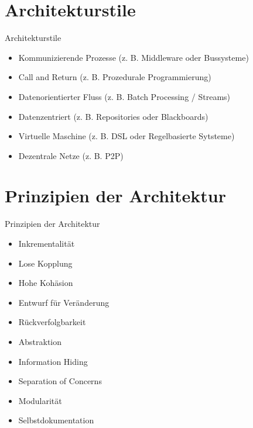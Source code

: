 \documentclass{beamer}
\begin{document}
\section{Architekturstile}

\begin{frame}{Architekturstile}
	\begin{itemize}
		\item Kommunizierende Prozesse (z. B. Middleware oder Bussysteme)
		\item Call and Return (z. B. Prozedurale Programmierung)
		\item Datenorientierter Fluss (z. B. Batch Processing / Streams)
		\item Datenzentriert (z. B. Repositories oder Blackboards)
		\item Virtuelle Maschine (z. B. DSL oder Regelbasierte Sytsteme)
		\item Dezentrale Netze (z. B. P2P)
	\end{itemize}
\end{frame}

\section{Prinzipien der Architektur}

\begin{frame}{Prinzipien der Architektur}
	\begin{itemize}
		\item{Inkrementalität} %
		\item{Lose Kopplung} %
		\item{Hohe Kohäsion} %
		\item{Entwurf für Veränderung} %
		\item{Rückverfolgbarkeit} %
		\item{Abstraktion} %
		\item{Information Hiding} %
		\item{Separation of Concerns} %
		\item{Modularität} %
		\item{Selbstdokumentation} %
	\end{itemize}
\end{frame}
\end{document}

